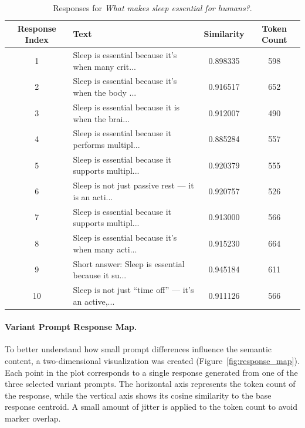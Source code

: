 \documentclass{article}
\begin{document}
\begin{table}[H]
    \centering
    \caption{Responses for \textit{What makes sleep essential for humans?}.}
    \label{tab:what_makes_sleep_essential}
    \begin{tabular}{c >{\raggedright\arraybackslash}p{8cm} S[table-format=1.6] c}
        \toprule
        Response Index & Text & Similarity & Token Count\\
         & Sleep is essential because it’s when many crit... & 0.898335 & 598\\
        2 & Sleep is essential because it’s when the body ... & 0.916517 & 652\\
        3 & Sleep is essential because it is when the brai... & 0.912007 & 490\\
        4 & Sleep is essential because it performs multipl... & 0.885284 & 557\\
        5 & Sleep is essential because it supports multipl... & 0.920379 & 555\\
        6 & Sleep is not just passive rest — it is an acti... & 0.920757 & 526\\
        7 & Sleep is essential because it supports multipl... & 0.913000 & 566\\
        8 & Sleep is essential because it’s when many acti... & 0.915230 & 664\\
        9 & Short answer: Sleep is essential because it su... & 0.945184 & 611\\
        10 & Sleep is not just “time off” — it’s an active,... & 0.911126 & 566\\
        \bottomrule
    \end{tabular}
\end{table}

\paragraph{Variant Prompt Response Map.} To better understand how small prompt differences influence the semantic content, a two-dimensional visualization was created (Figure~\ref{fig:response_map}). Each point in the plot corresponds to a single response generated from one of the three selected variant prompts. The horizontal axis represents the token count of the response, while the vertical axis shows its cosine similarity to the base response centroid. A small amount of jitter is applied to the token count to avoid marker overlap.
\end{document}
